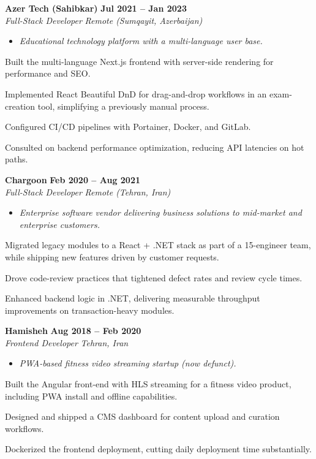 \documentclass[letterpaper,10pt]{article}
\newcommand{\heading}[2]{
  \hspace{10pt}#1\hfill#2\\
}
\newcommand{\headingBf}[2]{
  \heading{\textbf{#1}}{\textbf{#2}}
}
\newcommand{\headingIt}[2]{
  \heading{\textit{#1}}{\textit{#2}}
}
\newenvironment{resume_list}{
  \vspace{-7pt}
  \begin{itemize}[itemsep=-2px, parsep=1pt, leftmargin=30pt]
}{
  \end{itemize}
  \vspace{2pt}
}
\newcommand{\companyDescription}[1]{
  \vspace{-7pt}
  \begin{itemize}[itemsep=-2px, parsep=1pt, leftmargin=12pt]
    \item[] {\color{textMuted}\textit{#1}}
  \end{itemize}
  \vspace{-4pt}
}
\begin{document}
  \headingBf{ Azer Tech (Sahibkar) }{ Jul 2021 -- Jan 2023 }
  \headingIt{ Full-Stack Developer }{ Remote (Sumqayit, Azerbaijan) }
  \companyDescription{ Educational technology platform with a multi-language user base. }
  \begin{resume_list}
    \item Built the multi-language Next.js frontend with server-side rendering for performance and SEO.
    \item Implemented React Beautiful DnD for drag-and-drop workflows in an exam-creation tool, simplifying a previously manual process.
    \item Configured CI/CD pipelines with Portainer, Docker, and GitLab.
    \item Consulted on backend performance optimization, reducing API latencies on hot paths.
  \end{resume_list}

  \headingBf{ Chargoon }{ Feb 2020 -- Aug 2021 }
  \headingIt{ Full-Stack Developer }{ Remote (Tehran, Iran) }
  \companyDescription{ Enterprise software vendor delivering business solutions to mid-market and enterprise customers. }
  \begin{resume_list}
    \item Migrated legacy modules to a React + .NET stack as part of a 15-engineer team, while shipping new features driven by customer requests.
    \item Drove code-review practices that tightened defect rates and review cycle times.
    \item Enhanced backend logic in .NET, delivering measurable throughput improvements on transaction-heavy modules.
  \end{resume_list}

  \headingBf{ Hamisheh }{ Aug 2018 -- Feb 2020 }
  \headingIt{ Frontend Developer }{ Tehran, Iran }
  \companyDescription{ PWA-based fitness video streaming startup (now defunct). }
  \begin{resume_list}
    \item Built the Angular front-end with HLS streaming for a fitness video product, including PWA install and offline capabilities.
    \item Designed and shipped a CMS dashboard for content upload and curation workflows.
    \item Dockerized the frontend deployment, cutting daily deployment time substantially.
  \end{resume_list}
\end{document}

